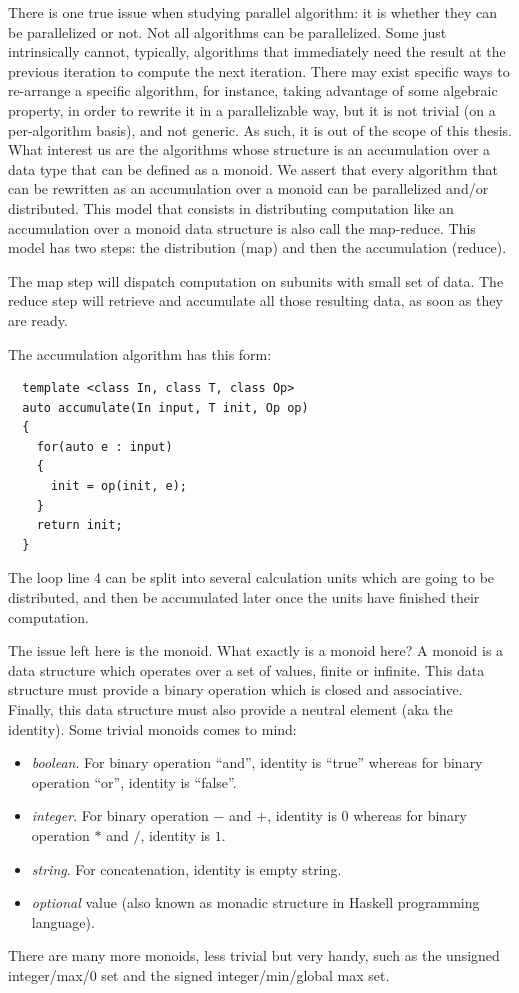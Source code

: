 There is one true issue when studying parallel algorithm: it is whether they can be parallelized or not. Not all
algorithms can be parallelized. Some just intrinsically cannot, typically, algorithms that immediately need the result
at the previous iteration to compute the next iteration. There may exist specific ways to re-arrange a specific
algorithm, for instance, taking advantage of some algebraic property, in order to rewrite it in a parallelizable way,
but it is not trivial (on a per-algorithm basis), and not generic. As such, it is out of the scope of this thesis. What
interest us are the algorithms whose structure is an accumulation over a data type that can be defined as a monoid. We
assert that every algorithm that can be rewritten as an accumulation over a monoid can be parallelized and/or
distributed. This model that consists in distributing computation like an accumulation over a monoid data structure is
also call the map-reduce. This model has two steps: the distribution (map) and then the accumulation (reduce).

The map step will dispatch computation on subunits with small set of data. The reduce step will retrieve and accumulate
all those resulting data, as soon as they are ready.

The accumulation algorithm has this form:
\begin{verbatim}
  template <class In, class T, class Op>
  auto accumulate(In input, T init, Op op)
  {
    for(auto e : input)
    {
      init = op(init, e);
    }
    return init;
  }
\end{verbatim}

The loop line 4 can be split into several calculation units which are going to be distributed, and then be accumulated
later once the units have finished their computation.

The issue left here is the monoid. What exactly is a monoid here? A monoid is a data structure which operates over a set
of values, finite or infinite. This data structure must provide a binary operation which is closed and associative.
Finally, this data structure must also provide a neutral element (aka the identity). Some trivial monoids comes to mind:
\begin{itemize}
  \item \emph{boolean}. For binary operation ``and'', identity is ``true'' whereas for binary operation ``or'', identity
        is ``false''.
  \item \emph{integer}. For binary operation \(-\) and \(+\), identity is \(0\) whereas for binary operation \(*\) and
        \(/\), identity is \(1\).
  \item \emph{string}. For concatenation, identity is empty string.
  \item \emph{optional} value (also known as monadic structure in Haskell programming language).
\end{itemize}
There are many more monoids, less trivial but very handy, such as the unsigned integer/max/0 set and the signed
integer/min/global max set.

